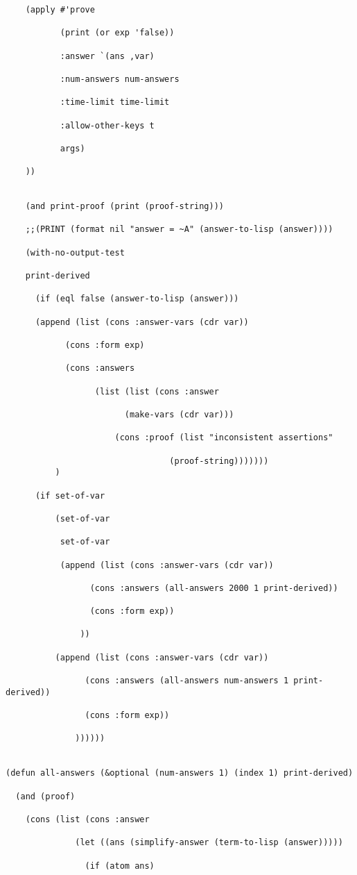 \begin{lstlisting}
	(apply #'prove 

	       (print (or exp 'false))

	       :answer `(ans ,var)

	       :num-answers num-answers

	       :time-limit time-limit

	       :allow-other-keys t

	       args)

	))


	(and print-proof (print (proof-string)))

    ;;(PRINT (format nil "answer = ~A" (answer-to-lisp (answer))))

    (with-no-output-test

	print-derived

      (if (eql false (answer-to-lisp (answer)))

	  (append (list (cons :answer-vars (cdr var))

			(cons :form exp)

			(cons :answers 

			      (list (list (cons :answer 

						(make-vars (cdr var)))

					  (cons :proof (list "inconsistent assertions"

							     (proof-string)))))))
		  )

	  (if set-of-var

	      (set-of-var 

	       set-of-var

	       (append (list (cons :answer-vars (cdr var))

			     (cons :answers (all-answers 2000 1 print-derived))

			     (cons :form exp))

		       ))

	      (append (list (cons :answer-vars (cdr var))

			    (cons :answers (all-answers num-answers 1 print-derived))

			    (cons :form exp))

		      ))))))


(defun all-answers (&optional (num-answers 1) (index 1) print-derived)

  (and (proof)

	(cons (list (cons :answer 

			  (let ((ans (simplify-answer (term-to-lisp (answer)))))

			    (if (atom ans)


\end{lstlisting}
